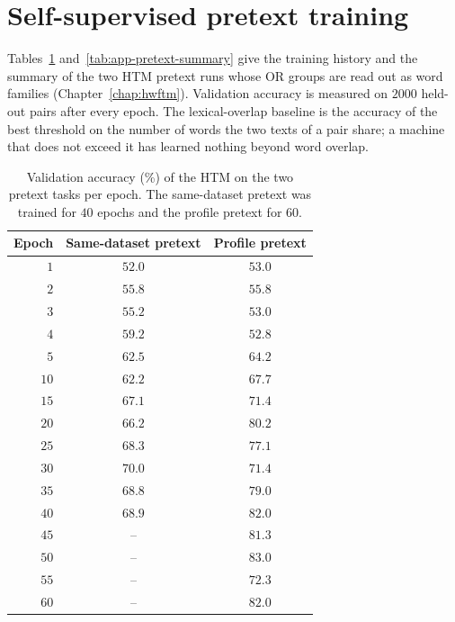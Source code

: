 
\section{Self-supervised pretext training}
\label{app:pretext}

Tables~\ref{tab:app-pretext-epochs} and~\ref{tab:app-pretext-summary} give the training history
and the summary of the two HTM pretext runs whose OR groups are read out as word families
(Chapter~\ref{chap:hwftm}). Validation accuracy is measured on $2000$ held-out pairs after every
epoch. The lexical-overlap baseline is the accuracy of the best threshold on the number of words
the two texts of a pair share; a machine that does not exceed it has learned nothing beyond word
overlap.

\begin{table}[H]
\centering
\small
\caption{Validation accuracy (\%) of the HTM on the two pretext tasks per epoch. The same-dataset
pretext was trained for $40$ epochs and the profile pretext for $60$.}
\label{tab:app-pretext-epochs}
\begin{tabular}{rcc}
\toprule
Epoch & Same-dataset pretext & Profile pretext \\
\midrule
$1$ & $52.0$ & $53.0$ \\
$2$ & $55.8$ & $55.8$ \\
$3$ & $55.2$ & $53.0$ \\
$4$ & $59.2$ & $52.8$ \\
$5$ & $62.5$ & $64.2$ \\
$10$ & $62.2$ & $67.7$ \\
$15$ & $67.1$ & $71.4$ \\
$20$ & $66.2$ & $80.2$ \\
$25$ & $68.3$ & $77.1$ \\
$30$ & $70.0$ & $71.4$ \\
$35$ & $68.8$ & $79.0$ \\
$40$ & $68.9$ & $82.0$ \\
$45$ & -- & $81.3$ \\
$50$ & -- & $83.0$ \\
$55$ & -- & $72.3$ \\
$60$ & -- & $82.0$ \\
\bottomrule
\end{tabular}
\end{table}

